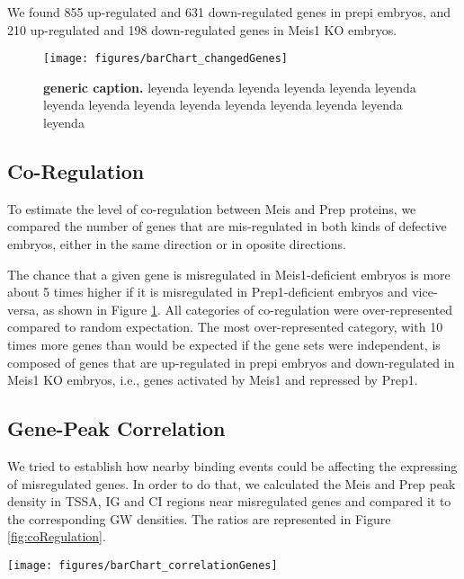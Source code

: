 We found 855 up-regulated and 631 down-regulated genes in \ac{prepi} embryos, and 210 up-regulated and 198 down-regulated genes in Meis1 \ac{KO} embryos. 

\begin{figure}[]
  \centering
  \texttt{[image: figures/barChart\_changedGenes]}
  \caption[generic caption]{\textbf{generic caption.} leyenda leyenda leyenda leyenda leyenda leyenda leyenda leyenda leyenda leyenda leyenda leyenda leyenda leyenda leyenda}
  \label{fig:changedGenes}
\end{figure}

\subsection{Co-Regulation}

To estimate the level of co-regulation between Meis and Prep proteins, we compared the number of genes that are mis-regulated in both kinds of defective embryos, either in the same direction or in oposite directions. 

The chance that a given gene is misregulated in Meis1-deficient embryos is more about 5 times higher if it is misregulated in Prep1-deficient embryos and vice-versa, as shown in Figure \ref{fig:changedGenes}. All categories of co-regulation were over-represented compared to random expectation. The most over-represented category, with 10 times more genes than would be expected if the gene sets were independent, is composed of genes that are up-regulated in \ac{prepi} embryos and down-regulated in Meis1 \ac{KO} embryos, i.e., genes activated by Meis1 and repressed by Prep1.

\subsection{Gene-Peak Correlation}

We tried to establish how nearby binding events could be affecting the expressing of misregulated genes. In order to do that, we calculated the Meis and Prep peak density in \ac{TSSA}, \ac{IG} and \ac{CI} regions near misregulated genes and compared it to the corresponding \ac{GW} densities. The ratios are represented in Figure \ref{fig:coRegulation}.

\begin{SCfigure}[]
  \centering
  \texttt{[image: figures/barChart\_correlationGenes]}
  \caption[Correlation Between Misregulation and TALE Binding]{\textbf{Correlation Between Misregulation and TALE Binding.} Ratio of Meis and Prep peak density in misregulated gene-associated \ac{TSSA}, \ac{IG} and \ac{CI} regions to the corresponding \ac{GW} averages. Asterisks mark p-value \< $10^{-3}$.}
  \label{fig:coRegulation}
\end{SCfigure}

